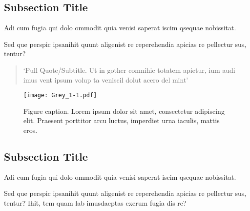 \documentclass[
]{ImperialPoster}
\begin{document}

\newpage

\titlesection{} %

\begin{multicols}{3} %


	\subsection{Subsection Title}

	Adi cum fugia qui dolo ommodit quia venisi saperat iscim qsequae nobissitat.

	Sed que perspic ipsanihit quunt aligenist re reperehendia \textcolor{ICLBlue}{apicias re pellectur sus, tentur?}

	\begin{quote}
		`Pull Quote/Subtitle. Ut in gother comnihic totatem apietur, ium audi imus vent ipsum volup ta veniscil dolut acero del mint'
	\end{quote}

	\begin{figure}[H] %
		\texttt{[image: Grey\_1-1.pdf]} %
		\caption{Figure caption. Lorem ipsum dolor sit amet, consectetur adipiscing elit. Praesent porttitor arcu luctus, imperdiet urna iaculis, mattis eros.}
	\end{figure}

	\subsection{Subsection Title}

	Adi cum fugia qui dolo ommodit quia venisi saperat iscim qsequae nobissitat.

	Sed que perspic ipsanihit quunt aligenist re reperehendia apicias re pellectur sus, tentur? Ihit, tem quam lab imusdaeptas exerum fugia dis re?


\end{multicols}
\end{document}
